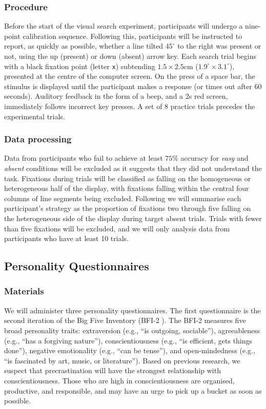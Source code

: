 \documentclass[]{rsos}
\begin{document}
\subsubsection{Procedure} Before the start of the visual search experiment, participants will undergo a nine-point calibration sequence. Following this, participants will be instructed to report, as quickly as possible, whether a line tilted $45^{\circ}$ to the right was present or not, using the up (present) or down (absent) arrow key. Each search trial begins with a black fixation point (letter \texttt{x}) subtending $1.5\times 2.5$cm ($1.9^{\circ}\times 3.1^{\circ}$), presented at the centre of the computer screen. On the press of a space bar, the stimulus is displayed until the participant makes a response (or times out after 60 seconds). Auditory feedback in the form of a beep, and a 2s red screen, immediately follows incorrect key presses. A set of 8 practice trials precedes the experimental trials.

\subsubsection{Data processing}

Data from participants who fail to achieve at least $75\%$ accuracy for \textit{easy} and \textit{absent} conditions will be excluded as it suggests that they did not understand the task. Fixations during trials will be classified as falling on the homogeneous or heterogeneous half of the display, with fixations falling within the central four columns of line segments being excluded. Following \cite{nowakowska2017} we will summarise each participant's strategy as the proportion of fixations two through five falling on the heterogeneous side of the display during target absent trials. Trials with fewer than five fixations will be excluded, and we will only analysis data from participants who have at least 10 trials. 

\subsection{Personality Questionnaires}

\subsubsection{Materials}

We will administer three personality questionnaires. The first questionnaire is the second iteration of the Big Five Inventory (BFI-2 \cite{soto2017}). The BFI-2 measures five broad personality traits: extraversion (e.g., ``is outgoing, sociable''), agreeableness (e.g., ``has a forgiving nature''), conscientiousness (e.g., ``is efficient, gets things done''), negative emotionality (e.g., ``can be tense''), and open-mindedness (e.g., ``is fascinated by art, music, or literature''). Based on previous research, we suspect that precrastination will have the strongest relationship with conscientiousness. Those who are high in conscientiousness are organised, productive, and responsible, and may have an urge to pick up a bucket as soon as possible.
\end{document}
